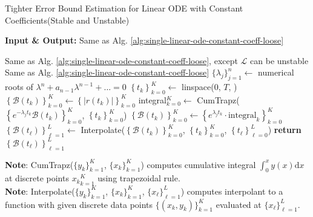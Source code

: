\documentclass[accepted]{uai2023}
\newcommand{\Bound}{\mathcal{B}}
\renewcommand{\L}{\mathcal{L}}
\begin{document}
    \begin{algorithm}
        \small
        \caption{Tighter Error Bound Estimation for Linear ODE with Constant Coefficients\quad  (Stable and Unstable)}\label{alg:single-linear-ode-constant-coeff-tight}
        \textbf{Input \& Output:} Same as Alg. \ref{alg:single-linear-ode-constant-coeff-loose}
        \begin{algorithmic}
            \Require Same as Alg. \ref{alg:single-linear-ode-constant-coeff-loose}, except $\L$ can be unstable
            \Ensure Same as Alg. \ref{alg:single-linear-ode-constant-coeff-loose}
            \State $\{\lambda_j\}_{j=1}^{n} \gets$ numerical roots of $\lambda^n+a_{n-1}\lambda^{n-1}+\dots=0$
            \State $\left\{t_k\right\}_{k=0}^{K} \gets$ linspace($0$, $T$, )
            \State $\left\{\Bound(t_k)\right\}_{k=0}^{K} \gets \left\{|r(t_k)|\right\}_{k=0}^{K}$
                \State integral$_{k=0}^{K} \gets$ CumTrapz($\left\{e^{-\lambda_j t_{k}} \Bound(t_k)\right\}_{k=0}^{K}$, $\left\{t_k\right\}_{k=0}^{K}$) 
                \State $\left\{\Bound(t_k)\right\}_{k=0}^{K} \gets \left\{e^{\lambda_j t_{k}}\cdot \text{integral}_k \right\}_{k=0}^{K}$ 
            \EndFor
            \State $\left\{\Bound(t_\ell)\right\}_{\ell=1}^{L} \gets $ Interpolate($\left\{\Bound(t_k)\right\}_{k=0}^{K}$, $\left\{t_k\right\}_{k=0}^{K}$, $\left\{t_\ell\right\}_{\ell=0}^{L}$) 
            \State \textbf{return} $\left\{\Bound(t_\ell)\right\}_{\ell=1}^{L}$ 
        \end{algorithmic}

        \vspace{0.5em} 
        \textbf{Note}: CumTrapz($\{y_k\}_{k=1}^K$, $\{x_k\}_{k=1}^K$) computes cumulative integral $\int_{0}^x y(x)\mathrm{d}x$ at discrete points ${x_k}_{k=1}^K$ using trapezoidal rule.\\
        \textbf{Note}: Interpolate($\{y_k\}_{k=1}^K$, $\{x_k\}_{k=1}^K$, $\{x_\ell\}_{\ell=1}^L$) computes interpolant to a function with given discrete data points $\{(x_k, y_k)\}_{k=1}^K$ evaluated at $\{x_\ell\}_{\ell=1}^L$.
    \end{algorithm}
\end{document}
